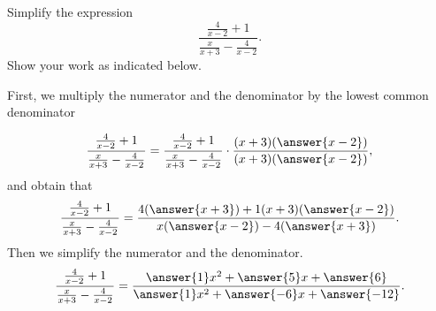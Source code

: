 \documentclass{ximera}
\author{Nela Lakos}
\begin{document}
\begin{exercise}

Simplify the  expression $$ \frac{\frac{4}{x-2}+1}{\frac{x}{x+3}-\frac{4}{x-2}}.$$ Show your work as indicated below.

First, we multiply the numerator and the denominator by  the lowest common denominator

	 \[
	 \frac{\frac{4}{x-2}+1}{\frac{x}{x+3}-\frac{4}{x-2}}= \frac{\frac{4}{x-2}+1}{\frac{x}{x+3}-\frac{4}{x-2}}\cdot \frac{(x+3)(\answer{x-2})}{(x+3)(\answer{x-2})},
	 \]
	and obtain that  
\[
\frac{\frac{4}{x-2}+1}{\frac{x}{x+3}-\frac{4}{x-2}}= \frac{4(\answer{x+3})+1(x+3)(\answer{x-2})}{x(\answer{x-2})-4(\answer{x+3})}.
\]
Then we simplify the numerator and the denominator.
\[
\frac{\frac{4}{x-2}+1}{\frac{x}{x+3}-\frac{4}{x-2}}= \frac{\answer{1}x^2+\answer{5}x+\answer{6}}{\answer{1}x^2+\answer{-6}x+\answer{-12}}.
\]
\end{exercise}
\end{document}
